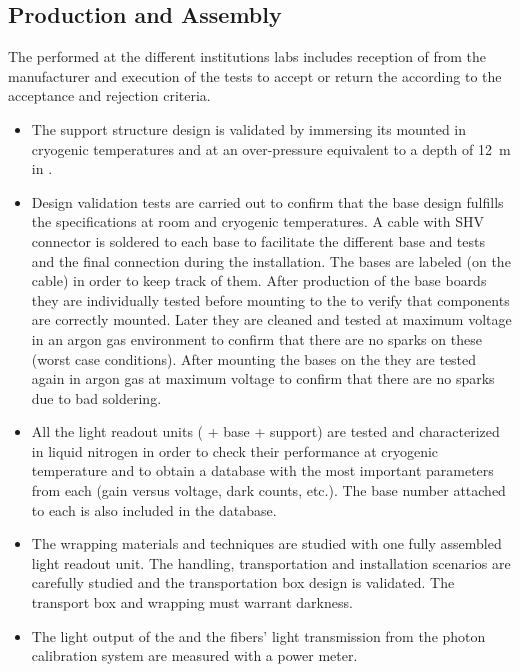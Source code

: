  \subsection{Production and Assembly}
 \label{sec:fddp-pd-10.1}
 
The  performed at the different institutions labs includes reception of  from the manufacturer and execution of the  tests to accept or return the  according to the acceptance and rejection criteria.

\begin{itemize}
\item The  support structure design is validated by immersing its mounted  in cryogenic temperatures and at an over-pressure equivalent to %
a depth of \SI{12}{m} in \lar{}. %
\item Design validation tests are carried out to confirm that the  base design fulfills the specifications at room and cryogenic temperatures. A cable with SHV connector is soldered to each  base to facilitate the different base and  tests and the final  connection during the installation. The  bases are labeled (on the cable) in order to keep track of them. After production of the  base boards they are individually tested before mounting to the  to verify that components are correctly mounted. Later they are cleaned and tested at maximum voltage in an argon gas environment to confirm that there are no sparks on these (worst case conditions).
After mounting the bases on the  they are tested again in argon gas at maximum voltage to confirm that there are no sparks due to bad soldering.
\item All the light readout units ( + base + support) are tested and characterized in liquid nitrogen in order to check their performance at cryogenic temperature and to obtain a database with the most important parameters from each  (gain versus voltage, dark counts, etc.). The  base number attached to each  is also included in the database. 
\item The wrapping materials and techniques are studied with one fully assembled light readout unit. The handling, transportation and installation scenarios are carefully studied and the transportation box design is validated. The transport box and  wrapping must warrant darkness. 
\item The light output of the  and the fibers' light transmission from the photon calibration system are measured with a power meter.
\end{itemize}

